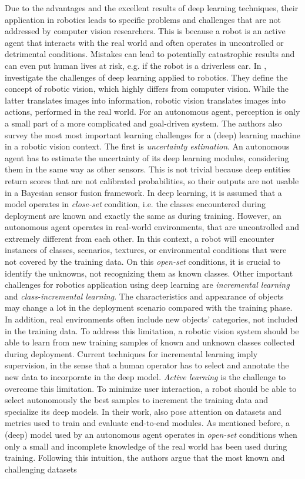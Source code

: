  Due to the advantages and the excellent results of deep learning techniques, their application in robotics leads to specific problems and challenges that are not addressed by computer vision researchers. This is because a robot is an active agent that interacts with the real world and often operates in uncontrolled or detrimental conditions. Mistakes can lead to potentially catastrophic results and can even put human lives at risk, e.g. if the robot is a driverless car. In \cite{surveydeeplimits}, \citeauthor{surveydeeplimits} investigate the challenges of deep learning applied to robotics. They define the concept of robotic vision, which highly differs from computer vision. While the latter translates images into information, robotic vision translates images into actions, performed in the real world. For an autonomous agent, perception is only a small part of a more complicated and goal-driven system. The authors also survey the most most important learning challenges for a (deep) learning machine in a robotic vision context. The first is \textit{uncertainty estimation}. An autonomous agent has to estimate the uncertainty of its deep learning modules, considering them in the same way as other sensors. This is not trivial because deep entities return scores that are not calibrated probabilities, so their outputs are not usable in a Bayesian sensor fusion framework. In deep learning, it is assumed that a model operates in \textit{close-set} condition,  i.e. the classes encountered during deployment are known and exactly the same as during training. However, an autonomous agent operates in real-world environments, that are uncontrolled and extremely different from each other. In this context, a robot will encounter instances of classes, scenarios, textures, or environmental conditions that were not covered by the training data. On this \textit{open-set} conditions, it is crucial to identify the unknowns, not recognizing them as known classes. Other important challenges for robotics application using deep learning are \textit{incremental learning} and \textit{class-incremental learning}. The characteristics and appearance of objects may change a lot in the deployment scenario compared with the training phase. In addition, real environments often include new objects' categories, not included in the training data. To address this limitation, a robotic vision system should be able to learn from new training samples of known and unknown classes collected during deployment. Current techniques for incremental learning imply supervision, in the sense that a human operator has to select and annotate the new data to incorporate in the deep model. \textit{Active learning} is the challenge to overcome this limitation. To minimize user interaction, a robot should be able to select autonomously the best samples to increment the training data and specialize its deep models. In their work, \citeauthor{surveydeeplimits} also pose attention on datasets and metrics used to train and evaluate end-to-end modules. As mentioned before, a (deep) model used by an autonomous agent operates in \textit{open-set} conditions when only a small and incomplete knowledge of the real world has been used during training. Following this intuition, the authors argue that the most known and challenging datasets 